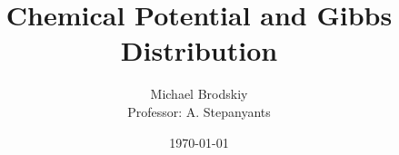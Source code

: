 


\title{Chemical Potential and Gibbs Distribution}
\date{\today}
\author{Michael Brodskiy\\ \small Professor: A. Stepanyants}



\maketitle

